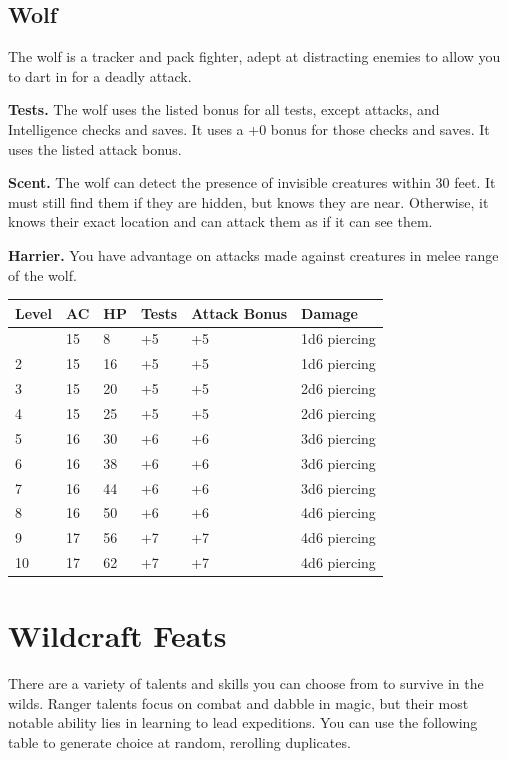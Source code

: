 \documentclass[12pt,letterpaper,twocolumn,openany,nodeprecatedcode,bg=none]{dndbook}
\begin{document}
\clearpage

\subsection{Wolf}\label{wolf}

The wolf is a tracker and pack fighter, adept at distracting enemies to
allow you to dart in for a deadly attack.

\textbf{Tests.} The wolf uses the listed bonus for all tests, except
attacks, and Intelligence checks and saves. It uses a +0 bonus for those
checks and saves. It uses the listed attack bonus.

\textbf{Scent.} The wolf can detect the presence of invisible creatures
within 30 feet. It must still find them if they are hidden, but knows
they are near. Otherwise, it knows their exact location and can attack
them as if it can see them.

\textbf{Harrier.} You have advantage on attacks made against creatures
in melee range of the wolf.

\begin{longtable}[]{@{}llllll@{}}
\toprule\noalign{}
Level & AC & HP & Tests & Attack Bonus & Damage \\
\midrule\noalign{}
\endhead
\bottomrule\noalign{}
\endlastfoot
1 & 15 & 8 & +5 & +5 & 1d6 piercing \\
2 & 15 & 16 & +5 & +5 & 1d6 piercing \\
3 & 15 & 20 & +5 & +5 & 2d6 piercing \\
4 & 15 & 25 & +5 & +5 & 2d6 piercing \\
5 & 16 & 30 & +6 & +6 & 3d6 piercing \\
6 & 16 & 38 & +6 & +6 & 3d6 piercing \\
7 & 16 & 44 & +6 & +6 & 3d6 piercing \\
8 & 16 & 50 & +6 & +6 & 4d6 piercing \\
9 & 17 & 56 & +7 & +7 & 4d6 piercing \\
10 & 17 & 62 & +7 & +7 & 4d6 piercing \\
\end{longtable}

\twocolumn

\section{Wildcraft Feats}\label{wildcraft-feats}

There are a variety of talents and skills you can choose from to survive
in the wilds. Ranger talents focus on combat and dabble in magic, but
their most notable ability lies in learning to lead expeditions. You can
use the following table to generate choice at random, rerolling
duplicates.
\end{document}

